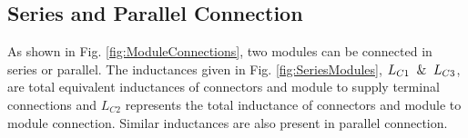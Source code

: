 \subsection{Series and Parallel Connection}

As shown in Fig. \ref{fig:ModuleConnections}, two modules can be connected in series or parallel. The inductances given in Fig. \ref{fig:SeriesModules}, $L_{C1} \And L_{C3}$, are total equivalent inductances of connectors and module to supply terminal connections and $L_{C2}$ represents the total inductance of connectors and module to module connection. Similar inductances are also present in parallel connection.
